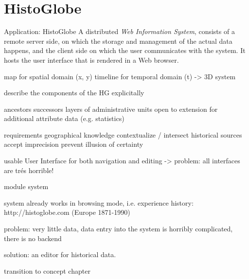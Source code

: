 




\section{HistoGlobe} %
\label{sec:histoglobe}


Application: HistoGlobe
A distributed \emph{Web Information System}, consists of a remote server side, on which the storage and management of the actual data happens, and the client side on which the user communicates with the system. It hosts the user interface that is rendered in a Web browser.

map for spatial domain (x, y)
timeline for temporal domain (t)
-> 3D system

describe the components of the HG explicitally

ancestors successors
layers of administrative units
open to extension for additional attribute data (e.g. statistics)

requirements
  geographical knowledge
  contextualize / intersect historical sources
  accept imprecision
  prevent illusion of certainty

usable User Interface for both navigation and editing
-> problem: all interfaces are trés horrible!

module system


system already works in browsing mode, i.e. experience history:
http://histoglobe.com
(Europe 1871-1990)


problem: very little data, data entry into the system is horribly complicated, there is no backend

solution: an editor for historical data.




\vspace{2em}

transition to concept chapter

